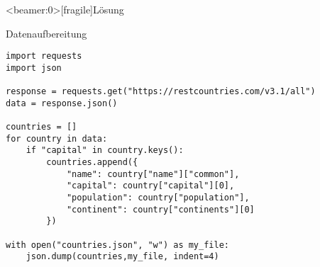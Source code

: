 \begin{frame}<beamer:0>[fragile]{Lösung}
\begin{solutionblock}{Datenaufbereitung}
\begin{verbatim}
import requests
import json 

response = requests.get("https://restcountries.com/v3.1/all")
data = response.json()

countries = []
for country in data: 
    if "capital" in country.keys():
        countries.append({
            "name": country["name"]["common"],
            "capital": country["capital"][0],
            "population": country["population"],
            "continent": country["continents"][0]
        }) 

with open("countries.json", "w") as my_file: 
    json.dump(countries,my_file, indent=4)
\end{verbatim}
\end{solutionblock}
\end{frame}















